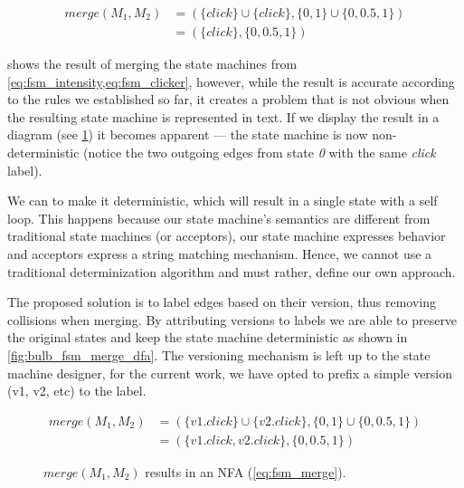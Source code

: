 \documentclass[a4paper]{article}
\begin{document}
\begin{equation}
    \begin{split}
        merge(M_1, M_2) & = (\{click\} \cup \{click\}, \{0, 1\} \cup \{0, 0.5, 1\}) \\
        & = (\{click\}, \{0, 0.5, 1\})
    \end{split}
    \label{eq:merge_m1_m2}
\end{equation}

 shows the result of merging the state machines from
\cref{eq:fsm_intensity,eq:fsm_clicker}, however, while the result is accurate according to
the rules we established so far, it creates a problem that is not obvious when the resulting
state machine is represented in text.
If we display the result in a diagram (see \cref{fig:bulb_fsm_merge_nfa}) it becomes apparent —
the state machine is now non-deterministic (notice the two outgoing edges from state \emph{0} with the same \emph{click} label).

We can to make it deterministic, which will result in a single state with a self loop.
This happens because our state machine's semantics are different from traditional
state machines (or acceptors), our state machine expresses behavior and acceptors
express a string matching mechanism. %
Hence, we cannot use a traditional determinization algorithm and must rather, define our own approach.

The proposed solution is to label edges based on their version, thus removing collisions when merging.
By attributing versions to labels we are able to preserve the original states and keep the state machine deterministic
as shown in \cref{fig:bulb_fsm_merge_dfa}.
The versioning mechanism is left up to the state machine designer,
for the current work, we have opted to prefix a simple version (v1, v2, etc) to the label.

\begin{equation}
    \begin{split}
        merge(M_1, M_2) & {}= (\{v1.click\} \cup \{v2.click\}, \{0, 1\} \cup \{0, 0.5, 1\}) \\
        & {}= (\{v1.click, v2.click\}, \{0, 0.5, 1\})
    \end{split}
    \label{eq:fsm_merge_fixed}
\end{equation}


\begin{figure}[ht]
    \centering
    \caption{$merge(M_1, M_2)$ results in an NFA (\cref{eq:fsm_merge}).}
    \label{fig:bulb_fsm_merge_nfa}
\end{figure}
\end{document}
